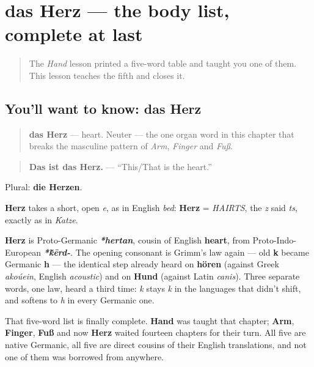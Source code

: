 \section[das Herz]{das Herz — the body list, complete at last}

\label{lesson:GE-C31-herz}



\begin{quote}
The \emph{Hand} lesson printed a five-word table and taught you one of them. This lesson teaches the fifth and closes it.
\end{quote}

\subsection*{You'll want to know: das Herz}
\begin{quote}
\textbf{das Herz} — heart. Neuter — the one organ word in this chapter that breaks the masculine pattern of \emph{Arm}, \emph{Finger} and \emph{Fuß}.
\end{quote}

\begin{quote}
\textbf{Das ist das Herz.} — \textquotedblleft{}This/That is the heart.\textquotedblright{}
\end{quote}

Plural: \textbf{die Herzen}.

\begin{sounds}
\textbf{Herz} takes a short, open \emph{e}, as in English \emph{bed}: \textbf{Herz} = \emph{HAIRTS}, the \emph{z} said \emph{ts}, exactly as in \emph{Katze}.
\end{sounds}

\begin{cousinweb}
\textbf{Herz} is Proto-Germanic \emph{\textbf{*hertan}}, cousin of English \textbf{heart}, from Proto-Indo-European \emph{\textbf{*\'{k}ērd-}}. The opening consonant is Grimm's law again — old \textbf{k} became Germanic \textbf{h} — the identical step already heard on \textbf{hören} (against Greek \emph{akoúein}, English \emph{acoustic}) and on \textbf{Hund} (against Latin \emph{canis}). Three separate words, one law, heard a third time: \emph{k} stays \emph{k} in the languages that didn't shift, and softens to \emph{h} in every Germanic one.

That five-word list is finally complete. \textbf{Hand} was taught that chapter; \textbf{Arm}, \textbf{Finger}, \textbf{Fuß} and now \textbf{Herz} waited fourteen chapters for their turn. All five are native Germanic, all five are direct cousins of their English translations, and not one of them was borrowed from anywhere.
\end{cousinweb}

